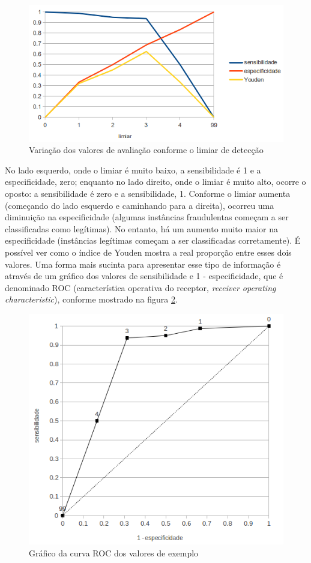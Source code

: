 \begin{figure}[h!]
    \centering
    \caption{Variação dos valores de avaliação conforme o limiar de detecção}
    \label{fraud:threshold}
    \includegraphics[scale=0.5]{img/threshold.png}
\end{figure}

No lado esquerdo, onde o limiar é muito baixo, a sensibilidade é 1 e a especificidade, zero; enquanto no lado direito, onde o limiar é muito alto, ocorre o oposto: a sensibilidade é zero e a sensibilidade, 1. Conforme o limiar aumenta (começando do lado esquerdo e caminhando para a direita), ocorreu uma diminuição na especificidade (algumas instâncias fraudulentas começam a ser classificadas como legítimas). No entanto, há um aumento muito maior na especificidade (instâncias legítimas começam a ser classificadas corretamente). É possível ver como o índice de Youden mostra a real proporção entre esses dois valores. Uma forma mais sucinta para apresentar esse tipo de informação é através de um gráfico dos valores de sensibilidade e 1 - especificidade, que é denominado ROC (característica operativa do receptor, \emph{receiver operating characteristic}), conforme mostrado na figura \ref{fraud:roc}.

\begin{figure}[h!]
    \centering
    \caption{Gráfico da curva ROC dos valores de exemplo}
    \label{fraud:roc}
    \includegraphics[scale=0.5]{img/roc.png}
\end{figure}

